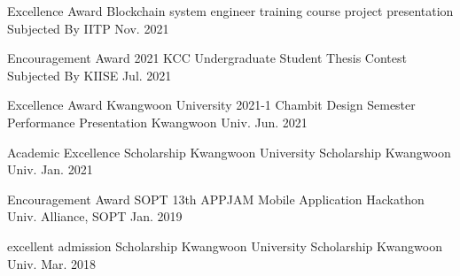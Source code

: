 \begin{cvhonors}

  \cvhonor
    {Excellence Award} %
    {Blockchain system engineer training course project presentation} %
    {Subjected By IITP} %
    {Nov. 2021} %

  \cvhonor
    {Encouragement Award} %
    {2021 KCC Undergraduate Student Thesis Contest} %
    {Subjected By KIISE} %
    {Jul. 2021} %

  \cvhonor
    {Excellence Award} %
    {Kwangwoon University 2021-1 Chambit Design Semester Performance Presentation} %
    {Kwangwoon Univ.} %
    {Jun. 2021} %

  \cvhonor
    {Academic Excellence Scholarship} %
    {Kwangwoon University Scholarship} %
    {Kwangwoon Univ.} %
    {Jan. 2021} %
    
  \cvhonor
    {Encouragement Award} %
    {SOPT 13th APPJAM Mobile Application Hackathon} %
    {Univ. Alliance, SOPT} %
    {Jan. 2019} %
    
  \cvhonor
    {excellent admission Scholarship} %
    {Kwangwoon University Scholarship} %
    {Kwangwoon Univ.} %
    {Mar. 2018} %
    
\end{cvhonors}
